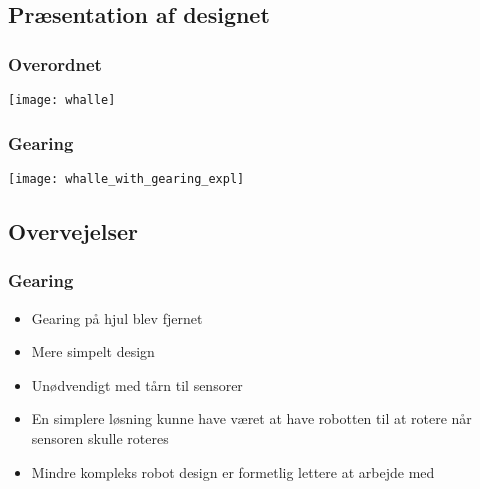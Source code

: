 \subsection{Præsentation af designet}
\begin{frame}
\frametitle{Overordnet}
\begin{center}
\texttt{[image: whalle]}
\end{center}
\end{frame}

\begin{frame}
\frametitle{Gearing}
\begin{center}
\texttt{[image: whalle\_with\_gearing\_expl]}
\end{center}

\end{frame}

\subsection{Overvejelser}
\begin{frame}
\frametitle{Gearing}
\begin{itemize}
\item Gearing på hjul blev fjernet
\item Mere simpelt design
\item Unødvendigt med tårn til sensorer
\item En simplere løsning kunne have været at have robotten til at rotere når sensoren skulle roteres
\item Mindre kompleks robot design er formetlig lettere at arbejde med
\end{itemize}
\end{frame}


